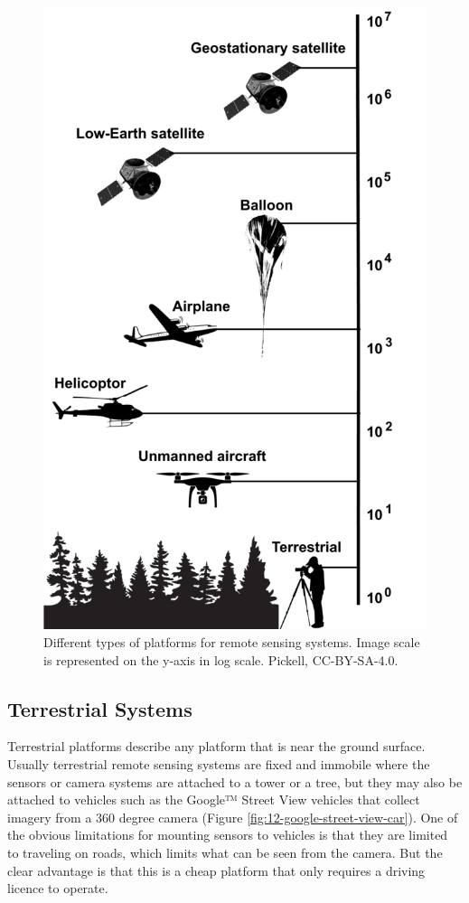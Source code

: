 \documentclass[
]{book}
\begin{document}
\begin{figure}
\includegraphics[width=0.5\linewidth]{images/12-platforms} \caption{Different types of platforms for remote sensing systems. Image scale is represented on the y-axis in log scale. Pickell, CC-BY-SA-4.0.}\label{fig:12-platforms}
\end{figure}

\subsection{Terrestrial Systems}\label{terrestrial-systems}

Terrestrial platforms describe any platform that is near the ground surface. Usually terrestrial remote sensing systems are fixed and immobile where the sensors or camera systems are attached to a tower or a tree, but they may also be attached to vehicles such as the Google™ Street View vehicles that collect imagery from a 360 degree camera (Figure \ref{fig:12-google-street-view-car}). One of the obvious limitations for mounting sensors to vehicles is that they are limited to traveling on roads, which limits what can be seen from the camera. But the clear advantage is that this is a cheap platform that only requires a driving licence to operate.
\end{document}
